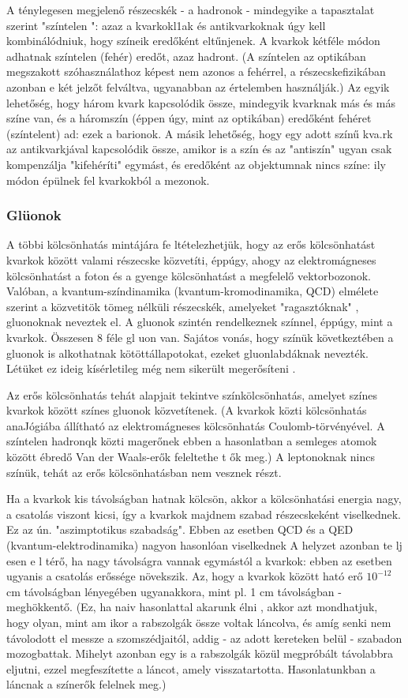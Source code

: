 \documentclass[../main.tex]{subfiles}
\begin{document}
A ténylegesen megjelenő részecskék - a hadronok - mindegyike a tapasztalat szerint "színtelen ": azaz a kvarkokl1ak és antikvarkoknak úgy kell kombinálódniuk,
hogy színeik eredőként eltűnjenek. A kvarkok kétféle módon adhatnak színtelen (fehér) eredőt, azaz hadront. (A színtelen az optikában
megszakott szóhasználathoz képest nem azonos a fehérrel, a részecskefizikában azonban e két jelzőt felváltva, ugyanabban az értelemben használják.)
Az egyik lehetőség, hogy három kvark kapcsolódik össze, mindegyik kvarknak más és más színe van, és a háromszín (éppen úgy, mint az optikában)
eredőként fehéret (színtelent) ad: ezek a barionok. A másik lehetőség, hogy
egy adott színű kva.rk az antikvarkjával kapcsolódik össze, amikor is a szín
és az "antiszín" ugyan csak kompenzálja "kifehéríti" egymást, és eredőként
az objektumnak nincs színe: ily módon épülnek fel kvarkokból a mezonok.

\subsubsection*{Glüonok}
A többi kölcsönhatás mintájára fe ltételezhetjük, hogy az erős kölcsönhatást
kvarkok között valami részecske közvetíti, éppúgy, ahogy az elektromágneses kölcsönhatást a foton és a gyenge kölcsönhatást a megfelelő vektorbozonok.
Valóban, a kvantum-színdinamika (kvantum-kromodinamika, QCD) elmélete szerint a közvetitök tömeg nélküli részecskék, amelyeket "ragasztóknak" , gluonoknak neveztek el. A gluonok szintén rendelkeznek színnel,
éppúgy, mint a kvarkok. Összesen 8 féle gl uon van. Sajátos vonás, hogy színük következtében a gluonok is alkothatnak kötöttállapotokat, ezeket gluonlabdáknak nevezték.
Létüket ez ideig kísérletileg még nem sikerült megerősíteni .

Az erős kölcsönhatás tehát alapjait tekintve színkölcsönhatás, amelyet
színes kvarkok között színes gluonok közvetítenek. (A kvarkok közti kölcsönhatás anaJógiába állítható az elektromágneses kölcsönhatás Coulomb-törvényével. A színtelen hadronqk közti magerőnek ebben a hasonlatban a
semleges atomok között ébredő Van der Waals-erők feleltethe t ők meg.) A
leptonoknak nincs színük, tehát az erős kölcsönhatásban nem vesznek részt.

Ha a kvarkok kis távolságban hatnak kölcsön, akkor a kölcsönhatási
energia nagy, a csatolás viszont kicsi, így a kvarkok majdnem szabad részecskeként viselkednek. Ez az ún. "aszimptotikus szabadság". Ebben az esetben
QCD és a QED (kvantum-elektrodinamika) nagyon hasonlóan viselkednek
A helyzet azonban te lj esen e l térő, ha nagy távolságra vannak egymástól a
kvarkok: ebben az esetben ugyanis a csatolás erőssége növekszik. Az, hogy
a kvarkok között ható erő $10^{-12}$ cm távolságban lényegében ugyanakkora,
mint pl. 1 cm távolságban - meghökkentő. (Ez, ha naiv hasonlattal akarunk
élni , akkor azt mondhatjuk, hogy olyan, mint am ikor a rabszolgák össze voltak láncolva, és amíg senki nem távolodott el messze a szomszédjaitól, addig
- az adott kereteken belül - szabadon mozogbattak. Mihelyt azonban egy
is a rabszolgák közül megpróbált távolabbra eljutni, ezzel megfeszítette a
láncot, amely visszatartotta. Hasonlatunkban a láncnak a színerők felelnek meg.)
\end{document}
